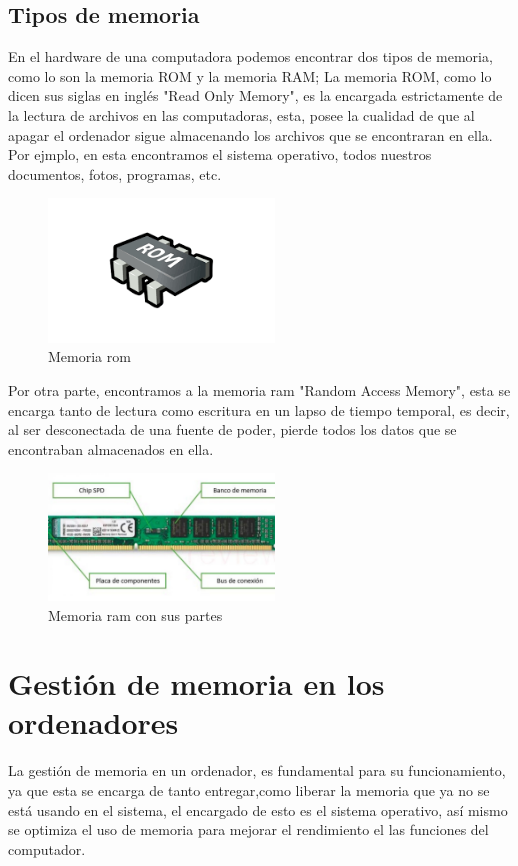 \documentclass{article}
\begin{document}
\subsection{Tipos de memoria}
En el hardware de una computadora podemos encontrar dos tipos de memoria, como lo son la memoria ROM y la memoria RAM; La memoria ROM, como lo dicen sus siglas en inglés "Read Only Memory", es la encargada estrictamente de la lectura de archivos en las computadoras, esta, posee la cualidad de que al apagar el ordenador sigue almacenando los archivos que se encontraran en ella. Por ejmplo, en esta encontramos el sistema operativo, todos nuestros documentos, fotos, programas, etc.
\begin{figure}[h]
    \centering
    \includegraphics[width=6cm]{rom.png}
    \centering
    \caption{Memoria rom}
    \label{fig:memoryrom}
\end{figure} 
 Por otra parte, encontramos a la memoria ram "Random Access Memory", esta se encarga tanto de lectura como escritura en un lapso de tiempo temporal, es decir, al ser desconectada de una fuente de poder, pierde todos los datos que se encontraban almacenados en ella.
\begin{figure}[h]
    \centering
    \includegraphics[width=6cm]{memory.jpg}
    \centering
    \caption{Memoria ram con sus partes}
    \label{fig:memoryram}
\end{figure} 
\section{Gestión de memoria en los ordenadores} 
La gestión de memoria en un ordenador, es fundamental para su funcionamiento, ya que esta se encarga de tanto entregar,como liberar la memoria que ya no se está usando en el sistema, el encargado de esto es el sistema operativo, así mismo se optimiza el uso de memoria para mejorar el rendimiento el las funciones del computador.
\end{document}
